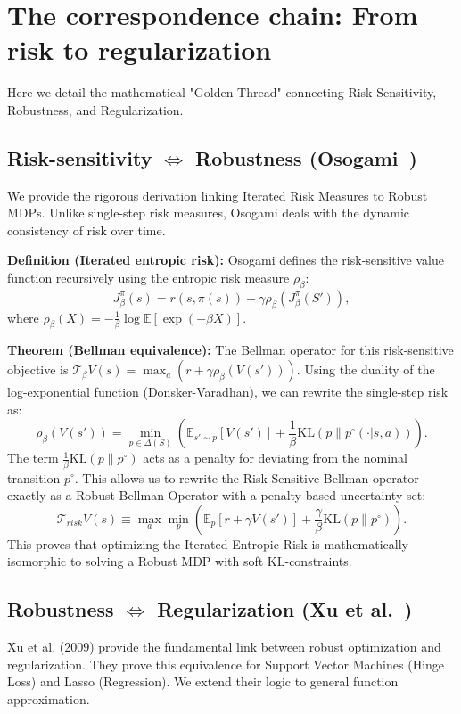 \section{The correspondence chain: From risk to regularization}
\label{app:equivalence}
Here we detail the mathematical "Golden Thread" connecting Risk-Sensitivity, Robustness, and Regularization.

\subsection{Risk-sensitivity $\iff$ Robustness (Osogami~\cite{Osogami2012Robustness})}
We provide the rigorous derivation linking Iterated Risk Measures to Robust MDPs.
Unlike single-step risk measures, Osogami deals with the dynamic consistency of risk over time.

\textbf{Definition (Iterated entropic risk):}
Osogami defines the risk-sensitive value function recursively using the entropic risk measure $\rho_\beta$:
\begin{equation}
    J_\beta^\pi(s) = r(s, \pi(s)) + \gamma \rho_\beta(J_\beta^\pi(S')),
\end{equation}
where $\rho_\beta(X) = -\frac{1}{\beta} \log \mathbb{E}[\exp(-\beta X)]$.

\textbf{Theorem (Bellman equivalence):}
The Bellman operator for this risk-sensitive objective is $\mathcal{T}_\beta V(s) = \max_a (r + \gamma \rho_\beta(V(s')))$. 
Using the duality of the log-exponential function (Donsker-Varadhan), we can rewrite the single-step risk as:
\begin{equation}
    \rho_\beta(V(s')) = \min_{p \in \Delta(S)} \left( \mathbb{E}_{s' \sim p}[V(s')] + \frac{1}{\beta} \text{KL}(p \| p^\circ(\cdot|s,a)) \right).
\end{equation}
The term $\frac{1}{\beta} \text{KL}(p \| p^\circ)$ acts as a penalty for deviating from the nominal transition $p^\circ$.
This allows us to rewrite the Risk-Sensitive Bellman operator exactly as a Robust Bellman Operator with a penalty-based uncertainty set:
\begin{equation}
    \mathcal{T}_{risk} V(s) \equiv \max_a \min_{p} \left( \mathbb{E}_{p}[r + \gamma V(s')] + \frac{\gamma}{\beta} \text{KL}(p \| p^\circ) \right).
\end{equation}
This proves that optimizing the Iterated Entropic Risk is mathematically isomorphic to solving a Robust MDP with soft KL-constraints.

\subsection{Robustness $\iff$ Regularization (Xu et al.~\cite{Xu2009RobustSVM})}
Xu et al. (2009) provide the fundamental link between robust optimization and regularization. They prove this equivalence for Support Vector Machines (Hinge Loss) and Lasso (Regression). We extend their logic to general function approximation.

